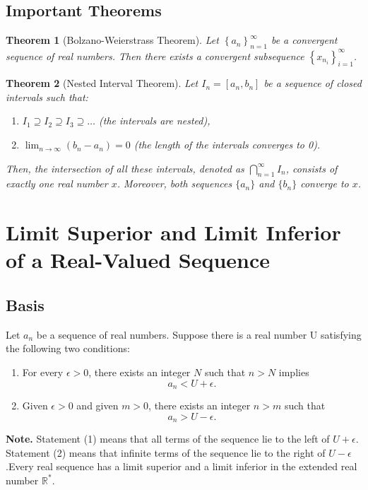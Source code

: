 \documentclass{article}
\newtheorem{theorem}{Theorem}[section]
\theoremstyle{definition}
\begin{document}
\subsection{Important Theorems}
\begin{theorem}[Bolzano-Weierstrass Theorem]
    Let $\left\{a_{n}\right\}_{n=1}^{\infty}$ be a convergent sequence of real numbers. Then there exists a convergent subsequence $\left\{x_{n_{i}}\right\}_{i=1}^{\infty}$.
\end{theorem}

\begin{theorem}[Nested Interval Theorem]
    Let \( I_n = [a_n, b_n] \) be a sequence of closed intervals such that:
\begin{enumerate}
    \item \( I_1 \supseteq I_2 \supseteq I_3 \supseteq \ldots \) (the intervals are nested),
    \item \( \lim_{n \to \infty} (b_n - a_n) = 0 \) (the length of the intervals converges to 0).
\end{enumerate}
Then, the intersection of all these intervals, denoted as \( \bigcap_{n=1}^{\infty} I_n \), consists of exactly one real number \( x \). Moreover, both sequences \( \{a_n\} \) and \( \{b_n\} \) converge to \( x \).
\end{theorem}



\section{Limit Superior and Limit Inferior of a Real-Valued Sequence}
\subsection{Basis}
Let ${a_{n}}$ be a sequence of real numbers. Suppose there is a real number U 
satisfying the following two conditions:

\begin{enumerate}
    \item For every $\epsilon > 0$, there exists an integer $N$ such that $n>N$ 
    implies $$a_{n}<U+\epsilon.$$
    \item Given $\epsilon>0$ and given $m>0$, there exists an integer $n>m$ such that 
    $$a_{n}>U-\epsilon.$$ 
\end{enumerate}

\textbf{Note.} Statement (1) means that all terms of the sequence lie to the left 
of $U+\epsilon$. Statement (2) means that infinite terms of the sequence lie to the 
right of $U-\epsilon$.Every real sequence has a limit superior and a limit inferior 
in the extended real number $\mathbb{R^{*}}$.
\end{document}
